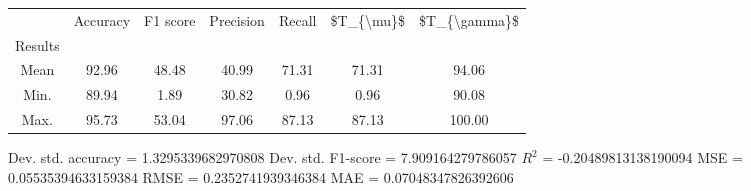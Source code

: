 \begin{tabular}{|c|c|c|c|c|c|c|}
\toprule
{} &  Accuracy &  F1 score &  Precision &  Recall &  \$T\_\{\textbackslash mu\}\$ &  \$T\_\{\textbackslash gamma\}\$ \\
Results &           &           &            &         &            &               \\
\hline
Mean    &     92.96 &     48.48 &      40.99 &   71.31 &      71.31 &         94.06 \\
Min.    &     89.94 &      1.89 &      30.82 &    0.96 &       0.96 &         90.08 \\
Max.    &     95.73 &     53.04 &      97.06 &   87.13 &      87.13 &        100.00 \\
\bottomrule
\end{tabular}

 Dev. std. accuracy = 1.3295339682970808
 Dev. std. F1-score = 7.909164279786057
 $R^2$ = -0.20489813138190094
 MSE = 0.05535394633159384
 RMSE = 0.2352741939346384
 MAE = 0.07048347826392606